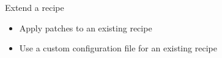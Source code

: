 \setuplabframe
{Extend a recipe}
{
  \begin{itemize}
    \item Apply patches to an existing recipe
    \item Use a custom configuration file for an existing recipe
  \end{itemize}
}
